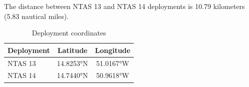 
The distance between NTAS 13 and NTAS 14 deployments is 10.79 kilometers (5.83 nautical miles).

\begin{table}[ht]
\centering
\caption{Deployment coordinates}
\begin{tabular}{lcc}
\hline
\textbf{Deployment} & \textbf{Latitude} & \textbf{Longitude} \\
\hline
NTAS 13 & 14.8253°N & 51.0167°W \\
NTAS 14 & 14.7440°N & 50.9618°W \\
\hline
\end{tabular}
\end{table}
